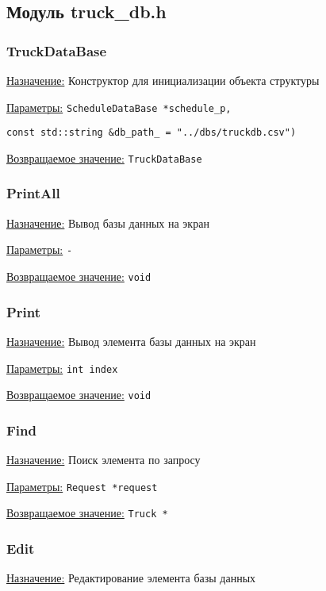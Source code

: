 \subsection{Модуль truck\_db.h}


\subsubsection{TruckDataBase}

\underline{Назначение:} Конструктор для инициализации объекта структуры

\underline{Параметры:} \verb|ScheduleDataBase *schedule_p,|

\verb|const std::string &db_path_ = "../dbs/truckdb.csv")|

\underline{Возвращаемое значение:} \verb|TruckDataBase|


\subsubsection{PrintAll}

\underline{Назначение:} Вывод базы данных на экран

\underline{Параметры:} \verb|-|

\underline{Возвращаемое значение:} \verb|void|


\subsubsection{Print}

\underline{Назначение:} Вывод элемента базы данных на экран

\underline{Параметры:} \verb|int index|

\underline{Возвращаемое значение:} \verb|void|


\subsubsection{Find}

\underline{Назначение:} Поиск элемента по запросу

\underline{Параметры:} \verb|Request *request|

\underline{Возвращаемое значение:} \verb|Truck *|


\subsubsection{Edit}

\underline{Назначение:} Редактирование элемента базы данных

